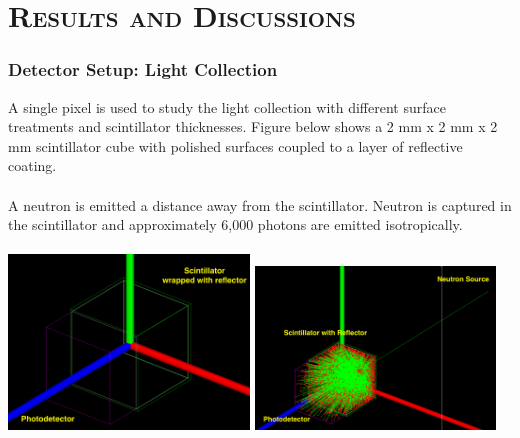 \documentclass[xcolor=x11names, compress, handout]{beamer}
\renewcommand{\(}{\begin{columns}}
\renewcommand{\)}{\end{columns}}
\newcommand{\<}[1]{\begin{column}{#1}}
\renewcommand{\>}{\end{column}}
\begin{document}
\section{\scshape Results and Discussions}

\begin{frame}
\frametitle{Detector Setup: Light Collection}
\scriptsize 
A single pixel is used to study the light collection with different surface treatments and scintillator thicknesses. Figure below shows a 2 mm x 2 mm x 2 mm scintillator cube with polished surfaces coupled to a layer of reflective coating. \\ 
\ \\
A neutron is emitted a distance away from the scintillator. Neutron is captured in the scintillator and approximately 6,000 photons are emitted isotropically. \\
\ \\
\centering
\includegraphics[width=0.48\textwidth, height=0.5\textheight]{images/scint_refl1.png}
\includegraphics[width=0.48\textwidth, height=0.5\textheight]{images/scint_refl_neutron.png}
\end{frame}
\end{document}
